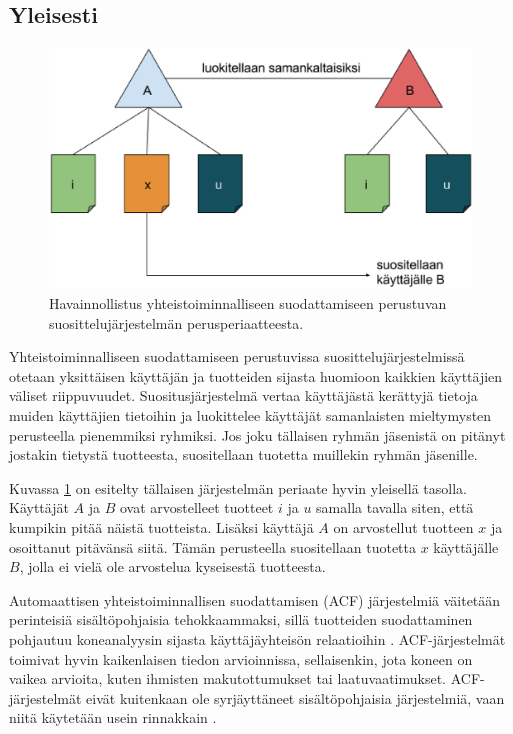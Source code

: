 \documentclass[12pt,finnish]{tktltiki2}
\theoremstyle{definition}
\theoremstyle{remark}
\begin{document}
\subsection{Yleisesti}
\begin{figure}[]
\includegraphics[width = 400pt]{yhteistoiminnallinen.eps}\caption{Havainnollistus yhteistoiminnalliseen suodattamiseen perustuvan suosittelujärjestelmän perusperiaatteesta.}
\label{yhteistoiminnallinen}
\end{figure}
        Yhteistoiminnalliseen suodattamiseen perustuvissa suosittelujärjestelmissä otetaan yksittäisen käyttäjän ja tuotteiden sijasta huomioon kaikkien käyttäjien väliset riippuvuudet. Suositusjärjestelmä vertaa käyttäjästä kerättyjä tietoja muiden käyttäjien tietoihin ja luokittelee käyttäjät samanlaisten mieltymysten perusteella pienemmiksi ryhmiksi. Jos joku tällaisen ryhmän jäsenistä on pitänyt jostakin tietystä tuotteesta, suositellaan tuotetta muillekin ryhmän jäsenille.
        
Kuvassa \ref{yhteistoiminnallinen} on esitelty tällaisen järjestelmän periaate hyvin yleisellä tasolla. Käyttäjät $A$ ja $B$ ovat arvostelleet tuotteet $i$ ja $u$ samalla tavalla siten, että kumpikin pitää näistä tuotteista. Lisäksi käyttäjä $A$ on arvostellut tuotteen $x$ ja osoittanut pitävänsä siitä. Tämän perusteella suositellaan tuotetta $x$ käyttäjälle $B$, jolla ei vielä ole arvostelua kyseisestä tuotteesta.
        
         Automaattisen yhteistoiminnallisen suodattamisen (ACF) järjestelmiä väitetään perinteisiä sisältöpohjaisia tehokkaammaksi, sillä tuotteiden suodattaminen pohjautuu koneanalyysin sijasta käyttäjäyhteisön relaatioihin \cite{Herlocker:2000:ECF:358916.358995}. ACF-järjestelmät toimivat hyvin kaikenlaisen tiedon arvioinnissa, sellaisenkin, jota koneen on vaikea arvioita, kuten ihmisten makutottumukset tai laatuvaatimukset. ACF-järjestelmät eivät kuitenkaan ole syrjäyttäneet sisältöpohjaisia järjestelmiä, vaan niitä käytetään usein rinnakkain \cite{Burke:2002:HRS:586321.586352}.
         
\end{document}
